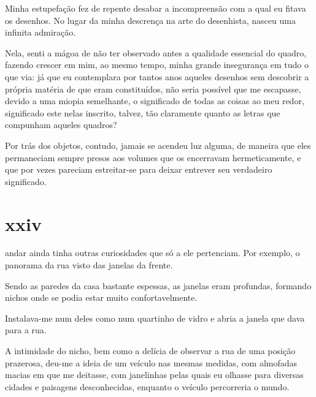 
Minha estupefação fez de repente desabar a incompreensão com a qual eu fitava
os desenhos. No lugar da minha descrença na arte do desenhista, nasceu uma
infinita admiração.

Nela, senti a mágoa de não ter observado antes a qualidade essencial do
quadro, fazendo crescer em mim, ao mesmo tempo, minha grande insegurança em
tudo o que via: já que eu contemplara por tantos anos aqueles desenhos sem
descobrir a própria matéria de que eram constituídos, não seria possível que
me escapasse, devido a uma miopia semelhante, o significado de todas as
coisas ao meu redor, significado este nelas inscrito, talvez, tão claramente
quanto as letras que compunham aqueles quadros?


Por trás dos objetos, contudo, jamais se acendeu luz alguma, de maneira que
eles permaneciam sempre presos aos volumes que os encerravam hermeticamente,
e que por vezes pareciam estreitar-se para deixar entrever seu verdadeiro
significado.


\section{xxiv} 

 andar ainda tinha outras curiosidades que só a ele
 pertenciam. Por exemplo, o panorama da rua visto das janelas da frente.

Sendo as paredes da casa bastante espessas, as janelas eram profundas,
formando nichos onde se podia estar muito confortavelmente.

Instalava-me num deles como num quartinho de vidro e abria a janela que dava
para a rua. 

A intimidade do nicho, bem como a delícia de observar a rua de uma posição
prazerosa, deu-me a ideia de um veículo nas mesmas medidas, com almofadas
macias em que me deitasse, com janelinhas pelas quais eu olhasse para
diversas cidades e paisagens desconhecidas, enquanto o veículo percorreria o
mundo.

